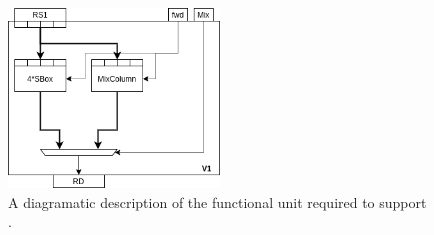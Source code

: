 \newpage

\vspace*{\fill}

\begin{figure}[!h]
\centering
\includegraphics[width={0.5\textwidth}]{diagrams/ise-datapath-v1.png}
\caption{
  A diagramatic description of the functional unit required to support .
}
\label{fig:v1:fu}
\end{figure}

\vspace*{\fill}

